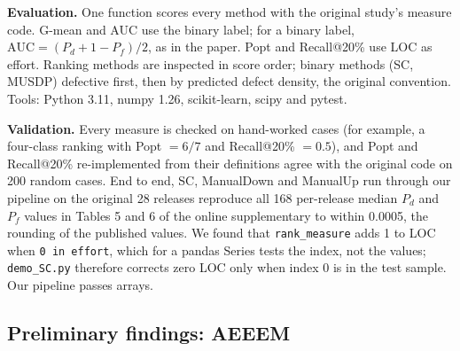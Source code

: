 \textbf{Evaluation.} One function scores every method with the original
study's measure code. G-mean and AUC use the binary label; for a binary label,
$\mathrm{AUC}=(P_d+1-P_f)/2$, as in the paper. Popt and Recall@20\% use LOC as
effort. Ranking methods are inspected in score order; binary methods (SC,
MUSDP) defective first, then by predicted defect density, the original
convention. Tools: Python 3.11, numpy 1.26, scikit-learn, scipy and pytest.

\textbf{Validation.} Every measure is checked on hand-worked cases (for
example, a four-class ranking with Popt $=6/7$ and Recall@20\% $=0.5$), and
Popt and Recall@20\% re-implemented from their definitions agree with the
original code on 200 random cases. End to end, SC, ManualDown and ManualUp
run through our pipeline on the original 28 releases reproduce all 168
per-release median $P_d$ and $P_f$ values in Tables 5 and 6 of the online
supplementary to within 0.0005, the rounding of the published values. We found that \texttt{rank\_measure} adds 1
to LOC when \texttt{0 in effort}, which for a pandas Series tests the index,
not the values; \texttt{demo\_SC.py} therefore corrects zero LOC only when
index 0 is in the test sample. Our pipeline passes arrays.

\subsection{Preliminary findings: AEEEM}

